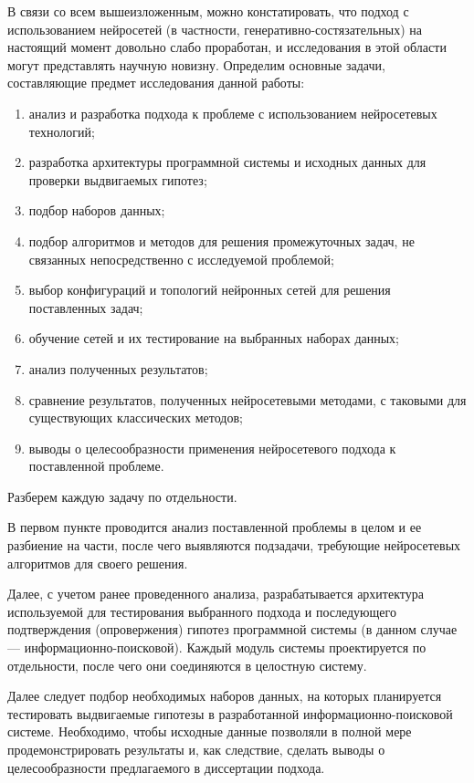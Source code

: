 В связи со всем вышеизложенным, можно констатировать, что подход с использованием нейросетей
(в частности, генеративно-состязательных) на настоящий момент довольно слабо проработан,
и исследования в этой области могут представлять научную новизну. Определим основные
задачи, составляющие предмет исследования данной работы:
\begin{enumerate}[1)]
    \item анализ и разработка подхода к проблеме с использованием нейросетевых технологий;
    \item разработка архитектуры программной системы и исходных данных для проверки
    выдвигаемых гипотез;
    \item подбор наборов данных;
    \item подбор алгоритмов и методов для решения промежуточных задач, не связанных непосредственно
    с исследуемой проблемой;
    \item выбор конфигураций и топологий нейронных сетей для решения поставленных задач;
    \item обучение сетей и их тестирование на выбранных наборах данных;
    \item анализ полученных результатов;
    \item сравнение результатов, полученных нейросетевыми методами, с таковыми для 
    существующих классических методов;
    \item выводы о целесообразности применения нейросетевого подхода к поставленной проблеме.
\end{enumerate}
Разберем каждую задачу по отдельности.

В первом пункте проводится анализ поставленной проблемы в целом и ее разбиение на части, после
чего выявляются подзадачи, требующие нейросетевых алгоритмов для своего решения.

Далее, с учетом ранее проведенного анализа, разрабатывается архитектура используемой для 
тестирования выбранного подхода и последующего подтверждения (опровержения) гипотез программной системы
(в данном случае --- информационно-поисковой). Каждый модуль системы проектируется по отдельности,
после чего они соединяются в целостную систему.

Далее следует подбор необходимых наборов данных, на которых планируется тестировать выдвигаемые гипотезы
в разработанной информационно-поисковой системе. Необходимо, чтобы исходные данные позволяли в полной
мере продемонстрировать результаты и, как следствие, сделать выводы о целесообразности предлагаемого
в диссертации подхода.


